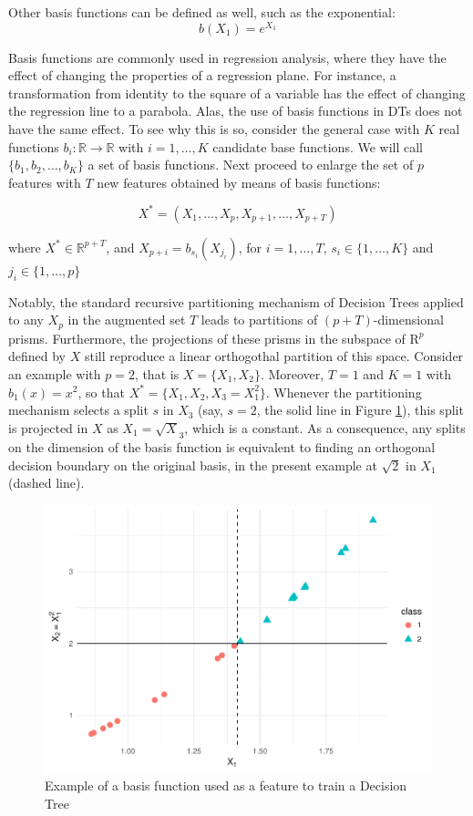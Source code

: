 \documentclass[]{elsarticle} %
\makeatletter
\def\maxwidth{\ifdim\Gin@nat@width>\linewidth\linewidth
\else\Gin@nat@width\fi}
\let\Oldincludegraphics\includegraphics
\renewcommand{\includegraphics}[1]{\Oldincludegraphics[width=\maxwidth]{#1}}
\makeatother
\begin{document}
Other basis functions can be defined as well, such as the exponential:
\[
b(X_1) = e^{X_1}
\]

Basis functions are commonly used in regression analysis, where they
have the effect of changing the properties of a regression plane. For
instance, a transformation from identity to the square of a variable has
the effect of changing the regression line to a parabola. Alas, the use
of basis functions in DTs does not have the same effect. To see why this
is so, consider the general case with \(K\) real functions
\(b_{i}:\mathbb{R}\rightarrow\mathbb{R}\) with \(i=1,\dots,K\) candidate
base functions. We will call \(\{b_1,b_2,\dots, b_K\}\) a set of basis
functions. Next proceed to enlarge the set of \(p\) features with \(T\)
new features obtained by means of basis functions:

\[
X^{\ast }=\left( X_{1},\dots,X_{p},X_{p+1},\dots ,X_{p+T} \right)
\]

where \(X^{\ast }\in \mathbb{R}^{p+T}\), and
\(X_{p+i}=b_{s_i}( X_{j_i})\), for \(i=1,\dots ,T\),
\(s_i\in \{1,\dots,K\}\) and \(j_i\in\{1,\dots,p\}\)

Notably, the standard recursive partitioning mechanism of Decision Trees
applied to any \(X_p\) in the augmented set \(T\) leads to partitions of
\(\left(p+T\right)\)-dimensional prisms. Furthermore, the projections of
these prisms in the subspace of \(\mathrm{R}^{p}\) defined by \(X\)
still reproduce a linear orthogothal partition of this space. Consider
an example with \(p=2\), that is \(X=\{X_1,X_2\}\). Moreover, \(T=1\)
and \(K=1\) with \(b_1(x)=x^2\), so that
\(X^\ast=\{X_1,X_2,X_3=X_1^2\}\). Whenever the partitioning mechanism
selects a split \(s\) in \(X_3\) (say, \(s=2\), the solid line in Figure
\ref{fig:fig3-simple-basis}), this split is projected in \(X\) as
\(X_1=\sqrt X_3\), which is a constant. As a consequence, any splits on
the dimension of the basis function is equivalent to finding an
orthogonal decision boundary on the original basis, in the present
example at \(\sqrt 2\) in \(X_1\) (dashed line).

\begin{figure}[htbp]
\centering
\includegraphics{Trees_with_Base_Functions_files/figure-latex/fig3-simple-basis-1.pdf}
\caption{\label{fig:fig3-simple-basis}Example of a basis function used
as a feature to train a Decision Tree}
\end{figure}
\end{document}
